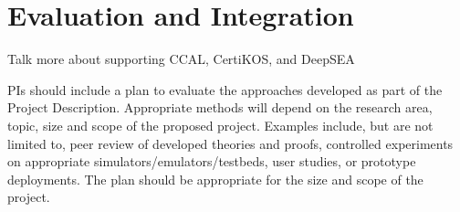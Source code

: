 \section{Evaluation and Integration}

Talk more about supporting CCAL, CertiKOS, and DeepSEA

PIs should include a plan to evaluate the approaches developed as part
of the Project Description. Appropriate methods will depend on the
research area, topic, size and scope of the proposed project. Examples
include, but are not limited to, peer review of developed theories and
proofs, controlled experiments on appropriate
simulators/emulators/testbeds, user studies, or prototype
deployments. The plan should be appropriate for the size and scope of
the project.
